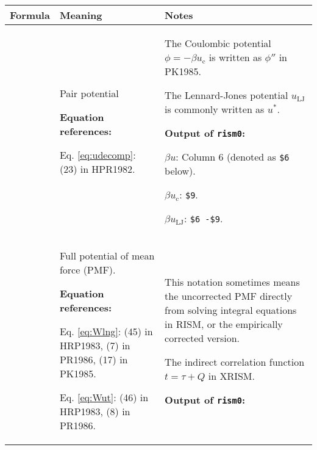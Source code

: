 \documentclass{article}
\begin{document}
\renewcommand{\theequation}{\Alph{equation}}

\newcommand{\refs}{\textbf{Equation references:}}

\newcommand{\rismprog}{\textbf{Output of \texttt{rism0}:}}


\begin{center}
\begin{tabular}{ >{\arraybackslash}m{2.5in}  >{\arraybackslash}m{2.2in}  >{\arraybackslash}m{2.5in} }

Formula
&
Meaning
&
Notes
\\
\hline

{
\begin{align}
  \beta u
&= \beta u_\mathrm{LJ} + \beta u_\mathrm{c}
\notag \\
&= -\phi^* - \phi.
\label{eq:udecomp}
\end{align}
}
&
Pair potential

\refs

Eq. \eqref{eq:udecomp}: (23) in HPR1982.
&
The Coulombic potential $\phi = -\beta u_\mathrm{c}$
is written as $\phi''$ in PK1985.

The Lennard-Jones potential $u_\mathrm{LJ}$
is commonly written as $u^*$.

\rismprog

$\beta u$: Column 6 (denoted as \texttt{\$6} below).

$\beta u_\mathrm{c}$: \texttt{\$9}.

$\beta u_\mathrm{LJ}$: \texttt{\$6 -\$9}.
\\



{
\begin{align}
\beta W
&= -\ln g
   \label{eq:Wlng} \\
&= \beta u - t. \; \mbox{(for HNC)}
   \label{eq:Wut}
\end{align}
}
&
Full potential of mean force (PMF).

\refs

Eq. \eqref{eq:Wlng}:
(45) in HRP1983,
(7) in PR1986,
(17) in PK1985.

Eq. \eqref{eq:Wut}:
(46) in HRP1983,
(8) in PR1986.
&
This notation sometimes means
the uncorrected PMF directly from
solving integral equations in RISM,
or the empirically corrected version.

The indirect correlation function $t = \tau + Q$
in XRISM.

\rismprog


\end{tabular}
\end{center}
\end{document}
